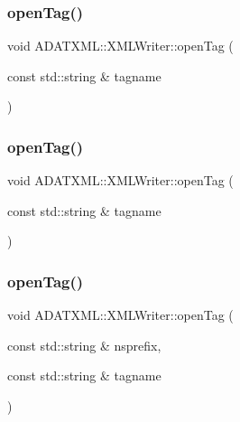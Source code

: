 \subsubsection{\texorpdfstring{openTag()}{openTag()}\hspace{0.1cm}{\footnotesize\ttfamily [2/12]}}
{\footnotesize\ttfamily void A\+D\+A\+T\+X\+M\+L\+::\+X\+M\+L\+Writer\+::open\+Tag (\begin{DoxyParamCaption}\item[{const std\+::string \&}]{tagname }\end{DoxyParamCaption})}

\mbox{\label{classADATXML_1_1XMLWriter_a75da06c5e515ccd9d519501915f50a8f}} 
\subsubsection{\texorpdfstring{openTag()}{openTag()}\hspace{0.1cm}{\footnotesize\ttfamily [3/12]}}
{\footnotesize\ttfamily void A\+D\+A\+T\+X\+M\+L\+::\+X\+M\+L\+Writer\+::open\+Tag (\begin{DoxyParamCaption}\item[{const std\+::string \&}]{tagname }\end{DoxyParamCaption})}

\mbox{\label{classADATXML_1_1XMLWriter_aa65d48238c4b08ebcedd534501e7cbaa}} 
\subsubsection{\texorpdfstring{openTag()}{openTag()}\hspace{0.1cm}{\footnotesize\ttfamily [4/12]}}
{\footnotesize\ttfamily void A\+D\+A\+T\+X\+M\+L\+::\+X\+M\+L\+Writer\+::open\+Tag (\begin{DoxyParamCaption}\item[{const std\+::string \&}]{nsprefix,  }\item[{const std\+::string \&}]{tagname }\end{DoxyParamCaption})}

\mbox{\label{classADATXML_1_1XMLWriter_aa65d48238c4b08ebcedd534501e7cbaa}} 
